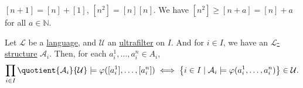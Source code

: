 \begin{eg}
	\([n+1] = [n] + [1]\), \([n^2] = [n] [n]\). We have \([n^2] \geq [n+a] = [n] + a\) for all \(a\in \mathbb{N} \).
\end{eg}

\begin{theorem}\label{thm:Los}
	Let \(\mathcal{L} \) be a \hyperref[def:language]{language}, and \(\mathcal{U} \) an \hyperref[def:ultrafilter]{ultrafilter} on \(I\). And for \(i\in I\), we have an \hyperref[def:structure]{\(\mathcal{L} \)-structure} \(\mathcal{A} _i\). Then, for each \(a_i^1, \dots , a_i^n\in A_i\),
	\[
		\prod_{i\in I} \quotient{\mathcal{A} _i}{\mathcal{U} } \models \varphi ([a_i^1], \dots , [a_i^n]) \iff \left\{ i\in I \mid \mathcal{A} _i \models \varphi (a_i^1, \dots , a_i^n) \right\} \in \mathcal{U} .
	\]
\end{theorem}
